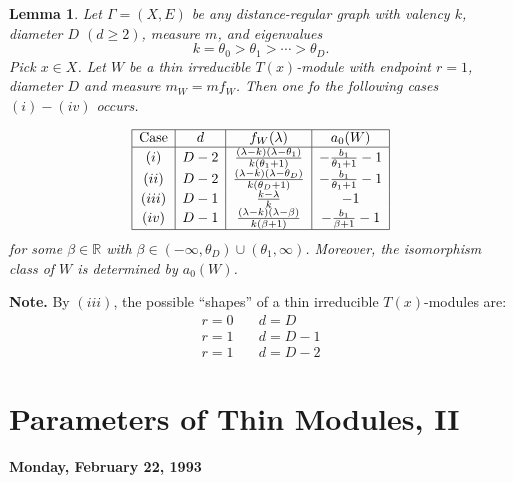 \documentclass[
]{book}
\newtheorem{lemma}{Lemma}[chapter]
\theoremstyle{definition}
\theoremstyle{definition}
\theoremstyle{definition}
\theoremstyle{definition}
\theoremstyle{remark}
\begin{document}
\begin{lemma}
\protect\hypertarget{lem:thin-endpoint1}{}\label{lem:thin-endpoint1}Let \(\Gamma = (X, E)\) be any distance-regular graph with valency \(k\), diameter \(D\) \((d\geq 2)\), measure \(m\), and eigenvalues
\[k = \theta_0 > \theta_1 > \cdots > \theta_D.\]
Pick \(x\in X\). Let
\(W\) be a thin irreducible \(T(x)\)-module with endpoint \(r = 1\), diameter \(D\) and measure \(m_W = mf_W\).
Then one fo the following cases \((i)-(iv)\) occurs.

\[\begin{array}{|c|c|c|c|}
\hline
\text{Case} & d  & f_W(\lambda) & a_0(W) \\
\hline
(i) & D-2 & \frac{(\lambda - k)(\lambda - \theta_1)}{k(\theta_1 + 1)} & -\frac{b_1}{\theta_1 + 1} -1\\
(ii) & D-2 & \frac{(\lambda - k)(\lambda - \theta_D)}{k(\theta_D + 1)} & -\frac{b_1}{\theta_1 + 1} -1\\
(iii) & D-1 & \frac{k - \lambda}{k} & -1\\
(iv) & D-1 & \frac{(\lambda - k)(\lambda - \beta)}{k(\beta + 1)} & -\frac{b_1}{\beta + 1} -1\\ 
\hline
\end{array}\]
for some \(\beta\in \mathbb{R}\) with \(\beta\in (-\infty, \theta_D) \cup (\theta_1, \infty)\).
Moreover, the isomorphism class of \(W\) is determined by \(a_0(W)\).
\end{lemma}

\textbf{Note.} By \((iii)\), the possible ``shapes'' of a thin irreducible \(T(x)\)-modules are:
\begin{align}
r = 0 & \quad d = D\\
r = 1 & \quad d = D-1\\
r = 1 & \quad d = D-2
\end{align}

\hypertarget{lec15}{%
\chapter{Parameters of Thin Modules, II}\label{lec15}}

\textbf{Monday, February 22, 1993}
\end{document}
